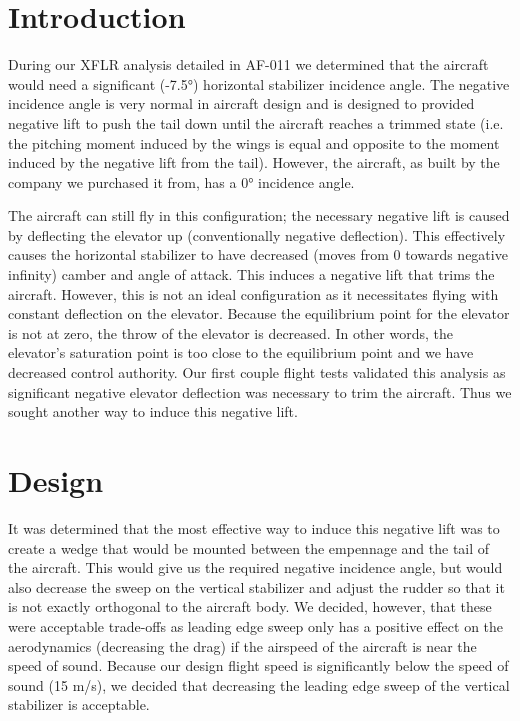 \documentclass[]{auvsi_doc}
\begin{document}
\begin{AUVSITitlePage}
\begin{artifacttable} 
\end{artifacttable}

\end{AUVSITitlePage}
\section{Introduction}

During our XFLR analysis detailed in AF-011 we determined that the aircraft would need a significant (-7.5°) horizontal stabilizer incidence angle. The negative incidence angle is very normal in aircraft design and is designed to provided negative lift to push the tail down until the aircraft reaches a trimmed state (i.e. the pitching moment induced by the wings is equal and opposite to the moment induced by the negative lift from the tail). However, the aircraft, as built by the company we purchased it from, has a 0° incidence angle. 

The aircraft can still fly in this configuration; the necessary negative lift is caused by deflecting the elevator up (conventionally negative deflection). This effectively causes the horizontal stabilizer to have decreased (moves from 0 towards negative infinity) camber and angle of attack. This induces a negative lift that trims the aircraft.  However, this is not an ideal configuration as it necessitates flying with constant deflection on the elevator. Because the equilibrium point for the elevator is not at zero, the throw of the elevator is decreased. In other words, the elevator's saturation point is too close to the equilibrium point and we have decreased control authority. Our first couple flight tests validated this analysis as significant negative elevator deflection was necessary to trim the aircraft. Thus we sought another way to induce this negative lift. 

\section{Design}

It was determined that the most effective way to induce this negative lift was to create a wedge that would be mounted between the empennage and the tail of the aircraft. This would give us the required negative incidence angle, but would also decrease the sweep on the vertical stabilizer and adjust the rudder so that it is not exactly orthogonal to the aircraft body. We decided, however, that these were acceptable trade-offs as leading edge sweep only has a positive effect on the aerodynamics (decreasing the drag) if the airspeed of the aircraft is near the speed of sound. Because our design flight speed is significantly below the speed of sound (15 m/s), we decided that decreasing the leading edge sweep of the vertical stabilizer is acceptable.
 
\end{document}
